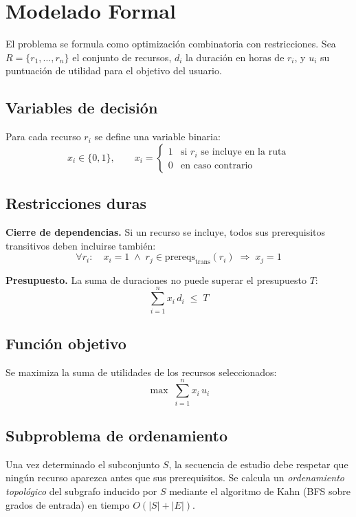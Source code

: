 \documentclass[11pt, a4paper]{article}
\begin{document}
\section{Modelado Formal}

El problema se formula como optimización combinatoria con restricciones. Sea $R = \{r_1, \dots, r_n\}$ el conjunto de recursos, $d_i$ la duración en horas de $r_i$, y $u_i$ su puntuación de utilidad para el objetivo del usuario.

\subsection{Variables de decisión}

Para cada recurso $r_i$ se define una variable binaria:
\[
x_i \in \{0, 1\}, \qquad
x_i =
\begin{cases}
1 & \text{si } r_i \text{ se incluye en la ruta} \\
0 & \text{en caso contrario}
\end{cases}
\]

\subsection{Restricciones duras}

\textbf{Cierre de dependencias.} Si un recurso se incluye, todos sus prerequisitos transitivos deben incluirse también:
\[
\forall r_i:\quad x_i = 1 \;\wedge\; r_j \in \mathrm{prereqs}_{\text{trans}}(r_i) \;\Longrightarrow\; x_j = 1
\]

\textbf{Presupuesto.} La suma de duraciones no puede superar el presupuesto $T$:
\[
\sum_{i=1}^{n} x_i \, d_i \;\le\; T
\]

\subsection{Función objetivo}

Se maximiza la suma de utilidades de los recursos seleccionados:
\[
\max \;\sum_{i=1}^{n} x_i \, u_i
\]

\subsection{Subproblema de ordenamiento}

Una vez determinado el subconjunto $S$, la secuencia de estudio debe respetar que ningún recurso aparezca antes que sus prerequisitos. Se calcula un \emph{ordenamiento topológico} del subgrafo inducido por $S$ mediante el algoritmo de Kahn (BFS sobre grados de entrada) en tiempo $O(|S| + |E|)$.
\end{document}
